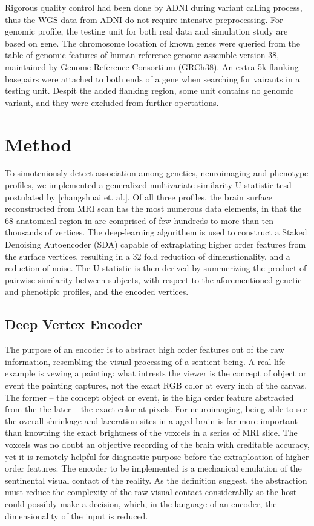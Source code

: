 \documentclass[twocolumn]{article}
\begin{document}
Rigorous quality control had been done by ADNI during variant calling process, thus the WGS data from ADNI do not require intensive preprocessing. For genomic profile, the testing unit for both real data and simulation study are based on gene. The chromosome location of known genes were queried from the table of genomic features of human reference genome assemble version 38, maintained by Genome Reference Consortium (GRCh38). An extra 5k flanking basepairs were attached to both ends of a gene when searching for vairants in a testing unit. Despit the added flanking region, some unit contains no genomic variant, and they were excluded from further opertations.

\section{Method}

To simoteniously detect association among genetics, neuroimaging and phenotype profiles, we implemented a generalized multivariate similarity U statistic tesd postulated by [changshuai et. al.]. Of all three profiles, the brain surface reconstructed from MRI scan has the most numerous data elements, in that the 68 anatomical region in are comprised of few hundreds to more than ten thousands of vertices. The deep-learning algorithem is used to construct a Staked Denoising Autoencoder (SDA) capable of extraplating higher order features from the surface vertices, resulting in a 32 fold reduction of dimenstionality, and a reduction of noise. The U statistic is then derived by summerizing the product of pairwise similarity between subjects, with respect to the aforementioned genetic and phenotipic profiles, and the encoded vertices. 

\subsection{Deep Vertex Encoder}
The purpose of an encoder is to abstract high order features out of the raw information, resembling the visual processing of a sentient being. A real life example is vewing a painting: what intrests the viewer is the concept of object or event the painting captures, not the exact RGB color at every inch of the canvas. The former -- the concept object or event, is the high order feature abstracted from the the later -- the exact color at pixels. For neuroimaging, being able to see the overall shrinkage and laceration sites in a aged brain is far more important than knowning the exact brightness of the voxcels in a series of MRI slice. The voxcels was no doubt an objective recording of the brain with creditable accuracy, yet it is remotely helpful for diagnostic purpose before the extraploation of higher order features. The encoder to be implemented is a mechanical emulation of the sentinental visual contact of the reality. As the definition suggest, the abstraction must reduce the complexity of the raw visual contact considerablly so the host could possibly make a decision, which, in the language of an encoder, the dimensionality of the input is reduced.  
\end{document}
